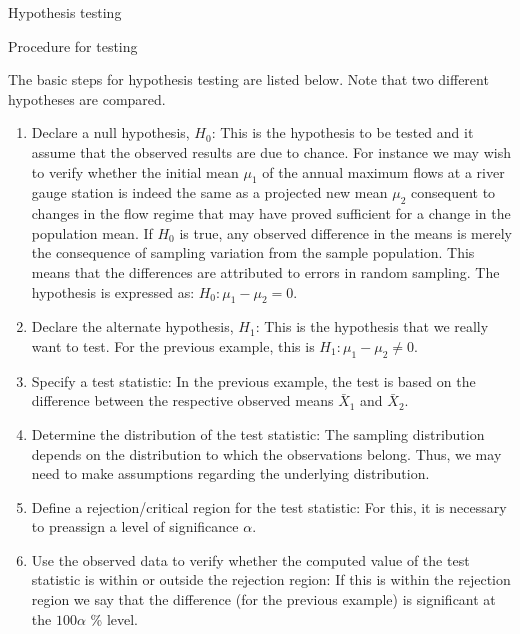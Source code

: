 \documentclass[8pt]{beamer}
\renewcommand{\emph}[1]{\textcolor{myorange}{#1}}
\begin{document}
\begin{frame}{Hypothesis testing}

    \begin{block}{Procedure for testing}
    \end{block}
    \vspace{-5pt}
    The basic steps for hypothesis testing are listed below. Note that two different \emph{hypotheses} are compared.
    \begin{enumerate}
        \item \alert{Declare a null hypothesis, $H_0$}:  This is the hypothesis to be tested and it assume that the observed results are due to chance. For instance we may wish to verify whether the initial mean $\mu_1$ of the annual maximum flows at a river gauge station is indeed the same as a projected new mean $\mu_2$ consequent to changes in the flow regime  that may have proved sufficient for a change in the population mean. If $H_0$ is true, any observed difference in the means is merely the consequence of sampling variation from the sample population. This means that the differences are attributed to errors in random sampling. The hypothesis is expressed as: $H_0: \mu_1 - \mu_2 = 0$.
        \item \alert{Declare the alternate hypothesis, $H_1$}: This is the hypothesis that we really want to test. For the previous example, this is $H_1 : \mu_1 - \mu_2 \neq 0$.
        \item \alert{Specify a test statistic}: In the previous example, the test is based on the difference between the respective observed means $\bar{X}_1$ and $\bar{X}_2$. 
        \item \alert{Determine the distribution of the test statistic}: The sampling distribution depends on the distribution to which the observations belong. Thus, we may need to make assumptions regarding the underlying distribution. 
        \item \alert{Define a rejection/critical region for the test statistic}: For this, it is necessary to preassign a level of significance $\alpha$. 
        \item \alert{Use the observed data to verify  whether the computed value of the test statistic is within or outside the rejection region}: If this is within the rejection region we say that the difference (for the previous example) is \emph{significant at the} $100\alpha$ \% level.  
    \end{enumerate}
\end{frame}
\end{document}
